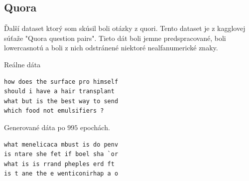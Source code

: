 \documentclass[10pt,a4paper]{article}
\begin{document}
\subsection{Quora}
Ďalší dataset ktorý som skúsil boli otázky z quori. 
Tento dataset je z kagglovej súťaže "Quora question pairs".
Tieto dát boli jemne predspracované, boli lowercasnotú a boli z nich odstránené niektoré nealfanumerické znaky. 

Reálne dáta
\begin{verbatim}
how does the surface pro himself
should i have a hair transplant 
what but is the best way to send
which food not emulsifiers ?
\end{verbatim}

Generované dáta po $995$  epochách.
\begin{verbatim}
what menelicaca mbust is do penv
is ntare she fet if boel sha `or
what is is rrand pheples erd ft 
is t ane the e wenticonirhap a o
\end{verbatim}
\end{document}
